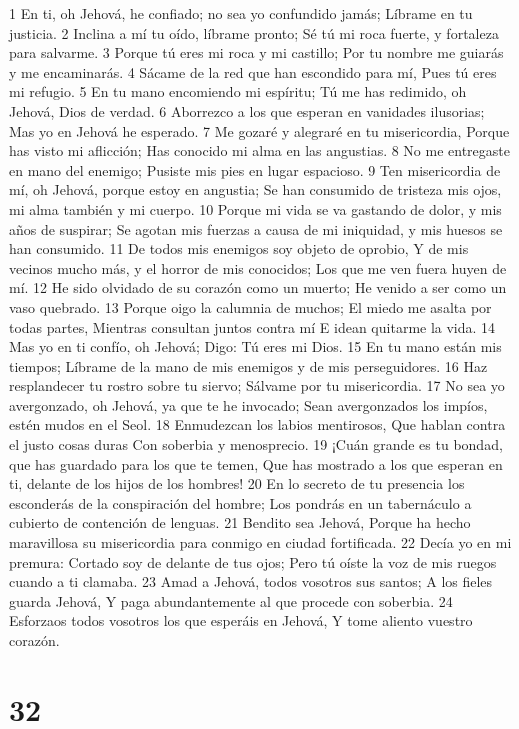 1 En ti, oh Jehová, he confiado; no sea yo confundido jamás;
Líbrame en tu justicia.
2 Inclina a mí tu oído, líbrame pronto;
Sé tú mi roca fuerte, y fortaleza para salvarme.
3 Porque tú eres mi roca y mi castillo;
Por tu nombre me guiarás y me encaminarás.
4 Sácame de la red que han escondido para mí,
Pues tú eres mi refugio.
5 En tu mano encomiendo mi espíritu; 
Tú me has redimido, oh Jehová, Dios de verdad.
6 Aborrezco a los que esperan en vanidades ilusorias;
Mas yo en Jehová he esperado.
7 Me gozaré y alegraré en tu misericordia,
Porque has visto mi aflicción;
Has conocido mi alma en las angustias.
8 No me entregaste en mano del enemigo;
Pusiste mis pies en lugar espacioso.
9 Ten misericordia de mí, oh Jehová, porque estoy en angustia;
Se han consumido de tristeza mis ojos, mi alma también y mi cuerpo.
10 Porque mi vida se va gastando de dolor, y mis años de suspirar;
Se agotan mis fuerzas a causa de mi iniquidad, y mis huesos se han consumido.
11 De todos mis enemigos soy objeto de oprobio,
Y de mis vecinos mucho más, y el horror de mis conocidos;
Los que me ven fuera huyen de mí.
12 He sido olvidado de su corazón como un muerto;
He venido a ser como un vaso quebrado.
13 Porque oigo la calumnia de muchos;
El miedo me asalta por todas partes,
Mientras consultan juntos contra mí
E idean quitarme la vida.
14 Mas yo en ti confío, oh Jehová;
Digo: Tú eres mi Dios.
15 En tu mano están mis tiempos;
Líbrame de la mano de mis enemigos y de mis perseguidores.
16 Haz resplandecer tu rostro sobre tu siervo;
Sálvame por tu misericordia.
17 No sea yo avergonzado, oh Jehová, ya que te he invocado;
Sean avergonzados los impíos, estén mudos en el Seol.
18 Enmudezcan los labios mentirosos,
Que hablan contra el justo cosas duras
Con soberbia y menosprecio.
19 ¡Cuán grande es tu bondad, que has guardado para los que te temen,
Que has mostrado a los que esperan en ti, delante de los hijos de los hombres!
20 En lo secreto de tu presencia los esconderás de la conspiración del hombre;
Los pondrás en un tabernáculo a cubierto de contención de lenguas.
21 Bendito sea Jehová,
Porque ha hecho maravillosa su misericordia para conmigo en ciudad fortificada.
22 Decía yo en mi premura: Cortado soy de delante de tus ojos;
Pero tú oíste la voz de mis ruegos cuando a ti clamaba.
23 Amad a Jehová, todos vosotros sus santos;
A los fieles guarda Jehová,
Y paga abundantemente al que procede con soberbia.
24 Esforzaos todos vosotros los que esperáis en Jehová,
Y tome aliento vuestro corazón.

\chapter{32}

